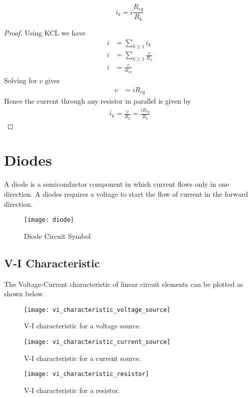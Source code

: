 \documentclass{article}
\begin{document}
\begin{theorem}
    \begin{equation*}
        i_k = i \frac{R_{eq}}{R_k}
    \end{equation*}
\end{theorem}
\begin{proof}
    Using KCL we have
    \begin{align*}
        i & = \sum_{k\geq1} i_k           \\
        i & = \sum_{k\geq1} \frac{v}{R_k} \\
        i & = \frac{v}{R_{eq}}
    \end{align*}
    Solving for $v$ gives
    \begin{align*}
        v & = i R_{eq}
    \end{align*}
    Hence the current through any resistor in parallel is given by
    \begin{align*}
        i_k = \frac{v}{R_k} = \frac{iR_{eq}}{R_k}
    \end{align*}
\end{proof}
\newpage
\section{Diodes}
\begin{definition}[Diode]
    A diode is a semiconductor component in which current flows only in one direction. A diodes requires a voltage to start the flow of current in the forward direction.
\end{definition}
\begin{figure}[H]
    \centering
    \texttt{[image: diode]}
    \caption{Diode Circuit Symbol}
\end{figure}
\subsection{V-I Characteristic}
The Voltage-Current characteristic of linear circuit elements can be plotted as shown below.
\begin{figure}[H]
    \centering
    \texttt{[image: vi\_characteristic\_voltage\_source]}
    \caption{V-I characteristic for a voltage source.}
\end{figure}
\begin{figure}[H]
    \centering
    \texttt{[image: vi\_characteristic\_current\_source]}
    \caption{V-I characteristic for a current source.}
\end{figure}
\begin{figure}[H]
    \centering
    \texttt{[image: vi\_characteristic\_resistor]}
    \caption{V-I characteristic for a resistor.}
\end{figure}
\end{document}
